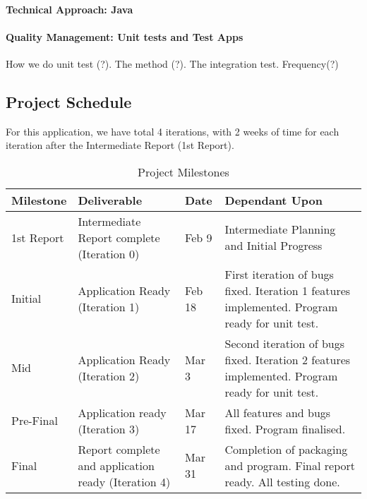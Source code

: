 \documentclass[11pt]{article}
\begin{document}
	\paragraph{Technical Approach: Java} 
	
	\paragraph{Quality Management: Unit tests and Test Apps} How we do unit test (?). The method (?). The integration test. Frequency(?)
\subsection{Project Schedule}
 For this application, we have total 4 iterations, with 2 weeks of time for each iteration after the Intermediate Report (1st Report). 
 	\begin{table}[ht]
		\caption{Project Milestones} %
		\centering %
		\begin{tabular}{p{2cm}|p{4cm}|p{2cm}|p{4cm}} %
		\hline\hline %
		Milestone & Deliverable & Date & Dependant Upon \\ [0.5ex] %
		\hline
		
		1st Report & Intermediate Report complete (Iteration 0) & Feb 9 & Intermediate Planning and Initial Progress\\
		
		Initial & Application Ready (Iteration 1) & Feb 18 & First iteration of bugs fixed. Iteration 1 features implemented. Program ready for unit test.  \\ 
		
		Mid & Application Ready (Iteration 2) & Mar 3 &  Second iteration of bugs fixed. Iteration 2 features implemented. Program ready for unit test.\\
		
		Pre-Final & Application ready (Iteration 3) & Mar 17 & All features and bugs fixed. Program finalised. \\
		
		Final & Report complete and application ready (Iteration 4)  & Mar 31 & Completion of packaging and program. Final report ready. All testing done. \\[1ex] %
		\hline
		\end{tabular}
		\label{table:milestones} %
	\end{table}
\end{document}
